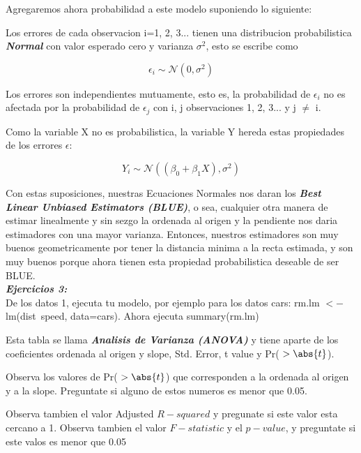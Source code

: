 \documentclass[letterpaper,11pt]{article}
\begin{document}
Agregaremos ahora probabilidad a este modelo suponiendo lo siguiente: \\

\begin{itemization}
\item Los errores de cada observacion i=1, 2, 3... tienen una distribucion probabilistica \textbf{\textit{Normal}} con valor esperado cero y varianza $\sigma^{2}$, esto se escribe como

	\begin{equation}
\epsilon_{i} \sim \mathcal{N}(0,\sigma^{2})
	\end{equation}

\item Los errores son independientes mutuamente, esto es, la probabilidad de $\epsilon_{i}$ no es afectada por la probabilidad de 
$\epsilon_{j}$ con i, j observaciones 1, 2, 3... y j $\neq$ i.

Como la variable X no es probabilistica, la variable Y hereda estas propiedades de los errores $\epsilon$:

	\begin{equation}
Y_{i} \sim \mathcal{N}( (\beta_{0} + \beta_{1} X),\sigma^{2})
	\end{equation}
	
Con estas suposiciones, nuestras Ecuaciones Normales nos daran los \textbf{\textit{Best Linear Unbiased Estimators (BLUE)}},
o sea, cualquier otra manera de estimar linealmente y sin sezgo la ordenada al origen y la pendiente nos daria estimadores con una mayor varianza. Entonces, nuestros estimadores son muy buenos geometricamente por tener la distancia minima a la recta estimada, y son muy buenos porque ahora tienen esta propiedad probabilistica deseable de ser BLUE.\\

\textbf{\textit{Ejercicios 3:}}\\

De los datos 1, ejecuta tu modelo, por ejemplo para los datos cars: rm.lm $<-$ lm(dist~speed, data=cars).
Ahora ejecuta summary(rm.lm)

Esta tabla se llama \textbf{\textit{Analisis de Varianza (ANOVA)}} y tiene aparte de los coeficientes ordenada al origen y slope,
Std. Error, t value y Pr( $> \abs{t}$).

Observa los valores de Pr( $> \abs{t}$) que corresponden a la ordenada al origen y a la slope.
Preguntate si alguno de estos numeros es menor que 0.05.

Observa tambien el valor Adjusted $R-squared$ y pregunate si este valor esta cercano a 1.
Observa tambien el valor $F-statistic$ y el $p-value$, y preguntate si este valos es menor que 0.05


\end{itemization}
\end{document}
